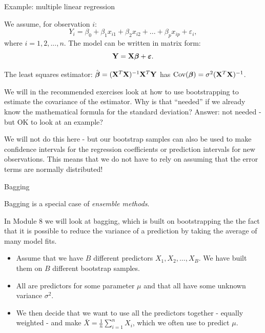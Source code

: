 \documentclass[10pt,ignorenonframetext,]{beamer}
\providecommand{\tightlist}{%
  \setlength{\itemsep}{0pt}\setlength{\parskip}{0pt}}
\begin{document}
\begin{frame}

\begin{block}{Example: multiple linear regression}

We assume, for observation \(i\):
\[Y_i= \beta_0 + \beta_{1}  x_{i1} + \beta_2 x_{i2} + ... + \beta_p x_{ip} + \varepsilon_i,\]
where \(i=1,2,...,n\). The model can be written in matrix form:
\[{\bf Y}={\bf X} \boldsymbol{\beta}+{\boldsymbol{\varepsilon}}.\]

The least squares estimator:
\(\hat{\boldsymbol\beta}=({\bf X}^T{\bf X})^{-1} {\bf X}^T {\bf Y}\) has
\(\text{Cov}(\boldsymbol\beta)=\sigma^2({\bf X}^T{\bf X})^{-1}\).

We will in the recommended exercises look at how to use bootstrapping to
estimate the covariance of the estimator. Why is that ``needed'' if we
already know the mathematical formula for the standard deviation?
Answer: not needed - but OK to look at an example?

We will not do this here - but our bootstrap samples can also be used to
make confidence intervals for the regression coefficients or prediction
intervals for new observations. This means that we do not have to rely
on assuming that the error terms are normally distributed!

\end{block}

\end{frame}

\begin{frame}

\begin{block}{Bagging}

Bagging is a special case of \emph{ensemble methods}.

In Module 8 we will look at bagging, which is built on bootstrapping the
the fact that it is possible to reduce the variance of a prediction by
taking the average of many model fits.

\begin{itemize}
\tightlist
\item
  Assume that we have \(B\) different predictors
  \(X_1, X_2, \ldots, X_B\). We have built them on \(B\) different
  bootstrap samples.
\item
  All are predictors for some parameter \(\mu\) and that all have some
  unknown variance \(\sigma^2\).
\item
  We then decide that we want to use all the predictors together -
  equally weighted - and make \(\bar{X}=\frac{1}{n} \sum_{i=1}^n X_i\),
  which we often use to predict \(\mu\).
\end{itemize}

\end{block}

\end{frame}
\end{document}
